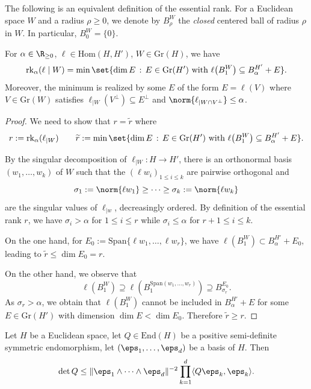 The following is an equivalent definition of the essential rank.
For a Euclidean space $W$ and a radius $\rho \geq 0$, we denote by $B_\rho^W$ the \emph{closed} centered ball of radius $\rho$ in $W$.
In particular, $B^W_0 = \{0\}$.
\begin{lemma}
\label{lem:essential_rank_eq}
For $\alpha \in \R_{\geq 0}$, $\ell \in \mathrm{Hom}(H,H')$,  $W \in \mathrm{Gr}(H)$, we have
\[
\mathrm{rk}_{\alpha}(\ell \mid W) = \min \set{\dim E \,:\, E \in \mathrm{Gr}(H') \text{ with } \ell \bigl(B^W_1\bigr) \subseteq B^{H'}_\alpha + E}.
\]
Moreover, the minimum is realized by some $E$ of the form $E=\ell(V)$ where $V\in\mathrm{Gr}(W)$ satisfies $\ell_{|W}(V^\perp)\subseteq E^\perp$ and $\norm{\ell_{|W\cap V^\perp}} \leq \alpha$.
\end{lemma}

\begin{proof}
We need to show that $r=\widetilde r$ where
\[
r:=\mathrm{rk}_\alpha(\ell_{|W})  \quad \quad \widetilde{r}:=\min \set{\dim E \,:\, E \in \mathrm{Gr}(H') \text{ with } \ell \bigl(B^W_1\bigr) \subseteq B^{H'}_\alpha + E}.
\]

By the singular decomposition of $\ell_{|W} : H \to H'$, there is an orthonormal basis $(w_1, \dotsc, w_k)$ of $W$ such that the $(\ell w_i)_{1\leq i \leq k}$ are pairwise orthogonal and
\[
\sigma_1 := \norm{\ell w_1} \geq \dots \geq \sigma_k :=\norm{\ell w_k}
\]
are the singular values of $\ell_{|w}$, decreasingly ordered.
By definition of the essential rank $r$, we have $\sigma_i > \alpha$ for $1 \leq i \leq r$ while $\sigma_i \leq \alpha$ for $r + 1 \leq i \leq k$.

On the one hand, for $E_0 := \mathrm{Span}\{\ell w_1, \dotsc, \ell w_r \}$, we have
\(
\ell(B_1^W) \subset B^{H'}_\alpha + E_0,
\)
leading to $\widetilde r \leq \dim E_0 = r $.

On the other hand, we observe that
$$\ell(B^W_{1})\supseteq \ell(B^{\mathrm{Span}(w_{1}, \dots, w_{r})}_{1}) \supseteq B^{E_{0}}_{\sigma_{r}}.$$
As $\sigma_{r}>\alpha$, we obtain that $\ell(B^W_{1})$ cannot be included in  $B_\alpha^{H'} + E$ for some $E\in \mathrm{Gr}(H')$ with dimension $\dim E<\dim E_{0}$. Therefore $\widetilde{r}\geq r$.
\end{proof}


\begin{lemma}
\label{lem:Choleski}
Let $H$ be a Euclidean space, let $Q\in \mathrm{End}(H)$ be a positive semi-definite symmetric endomorphism,  let  $(\eps_{1}, \dots, \eps_{d})$ be a basis of $H$.
Then
\begin{equation*}
\det Q \leq \|\eps_{1}\wedge \dots \wedge \eps_{d}\|^{-2}\prod_{k=1}^d \langle Q \eps_{k}, \eps_{k}\rangle.
\end{equation*}
\end{lemma}

